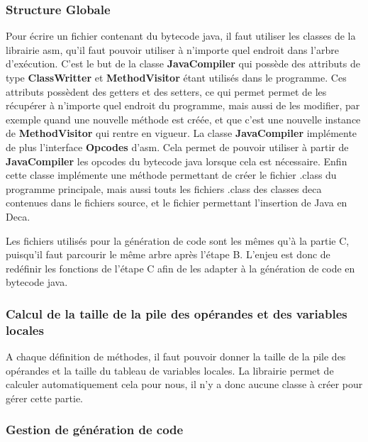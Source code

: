 \documentclass[12pt, a4paper, one side]{article}
\begin{document}
    \subsubsection{Structure Globale}

    Pour écrire un fichier contenant du bytecode java, il faut utiliser les classes
    de la librairie asm, qu'il faut pouvoir utiliser à n'importe quel endroit dans
    l'arbre d'exécution. C'est le but de la classe \textbf{JavaCompiler} qui
    possède des attributs de type \textbf{ClassWritter} et \textbf{MethodVisitor}
    étant utilisés dans le programme. Ces attributs possèdent des getters et des
    setters, ce qui permet permet de les récupérer à n'importe quel endroit du
    programme, mais aussi de les modifier, par
    exemple quand une nouvelle méthode est créée, et que c'est une nouvelle
    instance de \textbf{MethodVisitor} qui
    rentre en vigueur. La classe \textbf{JavaCompiler} implémente de plus
    l'interface \textbf{Opcodes} d'asm. Cela permet de pouvoir utiliser à partir
    de \textbf{JavaCompiler} les opcodes du bytecode java lorsque cela est
    nécessaire. Enfin cette classe implémente une méthode permettant de créer le
    fichier .class du programme principale, mais aussi touts les
    fichiers .class des classes deca contenues dans le fichiers source, et le
    fichier permettant l'insertion de Java en Deca.

    Les fichiers utilisés pour la génération de code sont les mêmes qu'à la partie
    C, puisqu'il faut parcourir le même arbre après l'étape B. L'enjeu est donc
    de redéfinir les fonctions de l'étape C afin de les adapter à la génération
    de code en bytecode java.

    \subsubsection{Calcul de la taille de la pile des opérandes et des variables locales}

    A chaque définition de méthodes, il faut pouvoir donner la taille de la pile
    des opérandes et la taille du tableau de variables locales. La librairie permet
    de calculer automatiquement cela pour nous, il n'y a donc aucune classe
    à créer pour gérer cette partie.

    \subsubsection{Gestion de génération de code}
\end{document}
